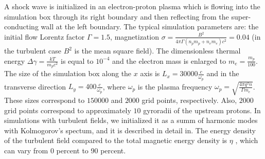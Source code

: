 \documentclass[a4paper]{jpconf}
\begin{document}
	A shock wave is initialized in an electron-proton plasma which is flowing into the simulation box through its right boundary and then reflecting from the super-conducting wall at the left boundary. The typical simulation parameters are: the initial flow Lorentz factor $\Gamma = 1.5$, magnetization $\sigma = \frac{B^2}{4\pi\Gamma (n_p m_p + n_e m_e) c^2} = 0.04$ (in the turbulent case $B^2$ is the mean square field). The dimensionless thermal energy $\Delta \gamma = \frac{k T}{m_p c^2}$ is equal to $10^{-4}$ and the electron mass is enlarged to $m_e = \frac{m_p}{100}$. The size of the simulation box along the $x$ axis is $L_x = 30000\frac{c}{\omega_p}$ and in the transverse direction $L_y = 400\frac{c}{\omega_p}$, where $\omega_p$ is the plasma frequency $\omega_p = \sqrt{\frac{4\pi q^2 n}{\Gamma m_e}}$. These sizes correspond to $150000$ and $2000$ grid points, respectively. Also, $2000$ grid points correspond to approximately $10$ gyroradii of the upstream protons.
	In simulations with turbulent fields, we initialized it as a summ of harmonic modes with Kolmogorov's spectum, and it is described  in detail in\cite{Romansky2019}. The energy density of the turbulent field compared to the total magnetic energy density is $\eta$ , which can vary  from 0 percent to 90 percent.
	
	
	
\end{document}
